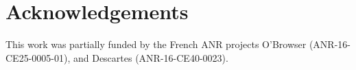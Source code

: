 
\section{Acknowledgements}

This work was partially funded by the French ANR projects O'Browser
(\mbox{ANR-16-CE25-0005-01}), and Descartes (\mbox{ANR-16-CE40-0023}).

